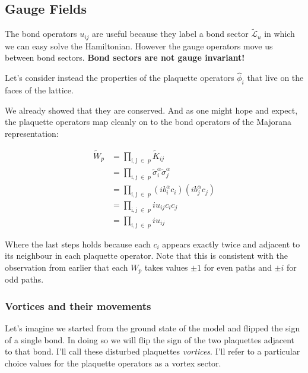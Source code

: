 \hypertarget{gauge-fields}{%
\subsection{Gauge Fields}\label{gauge-fields}}

The bond operators \(u_{ij}\) are useful because they label a bond sector \(\mathcal{\tilde{L}}_u\) in which we can easy solve the Hamiltonian. However the gauge operators move us between bond sectors. \textbf{Bond sectors are not gauge invariant!}

Let's consider instead the properties of the plaquette operators \(\hat{\phi}_i\) that live on the faces of the lattice.

We already showed that they are conserved. And as one might hope and expect, the plaquette operators map cleanly on to the bond operators of the Majorana representation:

\[\begin{aligned}
\tilde{W}_p &= \prod_{\mathrm{i,j}\; \in\; p} \tilde{K}_{ij}\\
            &= \prod_{\mathrm{i,j}\; \in\; p} \tilde{\sigma}_i^\alpha \tilde{\sigma}_j^\alpha\\
            &= \prod_{\mathrm{i,j}\; \in\; p} (ib^\alpha_i c_i)(ib^\alpha_j c_j)\\
            &= \prod_{\mathrm{i,j}\; \in\; p} i u_{ij} c_i c_j\\
            &= \prod_{\mathrm{i,j}\; \in\; p} i u_{ij}
\end{aligned}\]

Where the last steps holds because each \(c_i\) appears exactly twice and adjacent to its neighbour in each plaquette operator. Note that this is consistent with the observation from earlier that each \(W_p\) takes values \(\pm 1\) for even paths and \(\pm i\) for odd paths.

\hypertarget{vortices-and-their-movements}{%
\subsubsection{Vortices and their movements}\label{vortices-and-their-movements}}

Let's imagine we started from the ground state of the model and flipped the sign of a single bond. In doing so we will flip the sign of the two plaquettes adjacent to that bond. I'll call these disturbed plaquettes \emph{vortices}. I'll refer to a particular choice values for the plaquette operators as a vortex sector.

